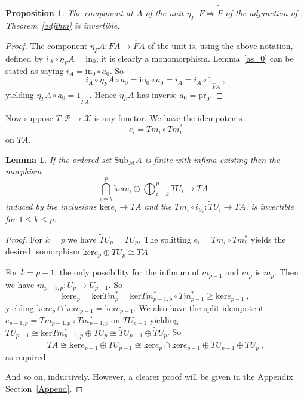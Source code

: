 \documentclass[a4paper,12pt,reqno]{amsart}
\newtheorem{lemma}[theorem]{Lemma}
\newtheorem{proposition}[theorem]{Proposition}
\theoremstyle{definition}
\theoremstyle{fact}
\theoremstyle{genquest}
\theoremstyle{step}
\newcommand{\lra}{\longrightarrow}
\newcommand{\ra}{\rightarrow}
\newcommand{\Lra}{\Longrightarrow}
\def\CM{{\mathscr M}}
\def\CP{{\mathscr P}}
\def\CX{{\mathscr X}}
\begin{document}
\begin{proposition}\label{unitinv}
The component at $A$ of the unit $\eta_F : F \Lra \widetilde{\widehat{F}}$ of the adjunction
of Theorem~\ref{adjthm} is invertible. 
\end{proposition}
\begin{proof}
The component $\eta_FA : FA \ra \widehat{F}A$ of the unit is, using
the above notation, defined by $i_A\circ \eta_FA = \mathrm{in}_0$;
it is clearly a monomorphism. Lemma~\ref{as=0} can be stated as
saying $i_A = \mathrm{in}_0 \circ a_0$. So
$$i_A \circ \eta_FA \circ a_0 = \mathrm{in}_0 \circ a_0 = i_A = i_A \circ 1_{\widetilde{\widehat{F}}A} \ ,$$
yielding $\eta_FA \circ a_0 = 1_{\widetilde{\widehat{F}}A}$. Hence $\eta_FA$ has inverse $a_0 = \mathrm{pr}_0$.     
\end{proof}

Now suppose $T: \CP \lra \CX$ is any functor.
We have the idempotents $$e_i = Tm_i \circ Tm_i^*$$ on $TA$.

\begin{lemma}\label{Tdecomp} 
If the ordered set $\mathrm{Sub}_{\CM}A$ is finite with infima existing then the morphism 
$$\bigcap_{i=k}^p{\mathrm{ker }e_i} \oplus \bigoplus_{i=k}^p{\widetilde{T}U_i} \lra TA \ ,$$
induced by the inclusions $\mathrm{ker }e_i \ra TA$ and the 
$Tm_i \circ i_{U_i} : \widetilde{T}U_i \ra TA$, is invertible for $1\le k \le p$. 
\end{lemma} 
\begin{proof}
For $k=p$ we have $\widetilde{T}U_p = TU_p$. The splitting $e_i = Tm_i \circ Tm_i^*$
yields the desired isomorphism $\mathrm{ker }e_p \oplus \widetilde{T}U_p \cong TA$.  

For $k=p-1$, the only possibility for the infimum of $m_{p-1}$ and $m_p$ is $m_p$.
Then we have $m_{p-1,p} : U_p \ra U_{p-1}$. So 
$$\mathrm{ker }e_p =\mathrm{ker }Tm_p^*= \mathrm{ker }Tm_{p-1,p}^*\circ Tm_{p-1}^* \ge \mathrm{ker }e_{p-1} \ ,$$
yielding $\mathrm{ker }e_p \cap \mathrm{ker }e_{p-1} = \mathrm{ker }e_{p-1}$.
We also have the split idempotent $e_{p-1,p} = Tm_{p-1,p} \circ Tm_{p-1,p}^*$ on $TU_{p-1}$
yielding $TU_{p-1} \cong \mathrm{ker }Tm_{p-1,p}^*\oplus TU_p \cong \widetilde{T}U_{p-1} \oplus \widetilde{T}U_p$. So
$$TA \cong \mathrm{ker }e_{p-1} \oplus TU_{p-1} \cong \mathrm{ker }e_p \cap \mathrm{ker }e_{p-1} \oplus \widetilde{T}U_{p-1} \oplus \widetilde{T}U_p \ ,$$
as required.   

And so on, inductively. However, a clearer proof will be given in the Appendix Section~\ref{Append}.
\end{proof}
\end{document}
